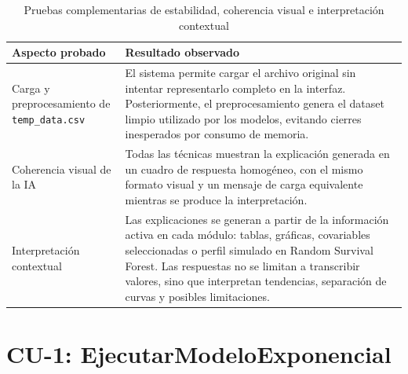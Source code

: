\begin{table}[H]
\centering
\small
\begin{tabularx}{\textwidth}{|p{}|X|}
\hline
\textbf{Aspecto probado} & \textbf{Resultado observado} \\ \hline
Carga y preprocesamiento de \texttt{temp\_data.csv} & El sistema permite cargar el archivo original sin intentar representarlo completo en la interfaz. Posteriormente, el preprocesamiento genera el dataset limpio utilizado por los modelos, evitando cierres inesperados por consumo de memoria. \\ \hline
Coherencia visual de la IA & Todas las técnicas muestran la explicación generada en un cuadro de respuesta homogéneo, con el mismo formato visual y un mensaje de carga equivalente mientras se produce la interpretación. \\ \hline
Interpretación contextual & Las explicaciones se generan a partir de la información activa en cada módulo: tablas, gráficas, covariables seleccionadas o perfil simulado en Random Survival Forest. Las respuestas no se limitan a transcribir valores, sino que interpretan tendencias, separación de curvas y posibles limitaciones. \\ \hline
\end{tabularx}
\caption{Pruebas complementarias de estabilidad, coherencia visual e interpretación contextual}
\label{tab:pruebas_complementarias_estabilidad_interfaz}
\normalsize
\end{table}

\Needspace{0.80\textheight}
\section{CU-1: EjecutarModeloExponencial}


